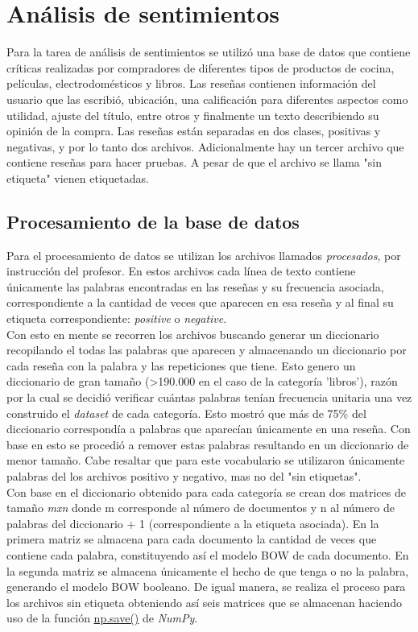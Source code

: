 \section{Análisis de sentimientos}
Para la tarea de análisis de sentimientos se utilizó una base de datos que contiene críticas realizadas por compradores de diferentes tipos de productos de cocina, películas, electrodomésticos y libros. Las reseñas contienen información del usuario que las escribió, ubicación, una calificación para diferentes aspectos como utilidad, ajuste del título, entre otros y finalmente un texto describiendo su opinión de la compra. Las reseñas están separadas en dos clases, positivas y negativas, y por lo tanto dos archivos. Adicionalmente hay un tercer archivo que contiene reseñas para hacer pruebas. A pesar de que el archivo se llama "sin etiqueta" vienen etiquetadas.

\subsection{Procesamiento de la base de datos}

Para el procesamiento de datos se utilizan los archivos llamados \textit{procesados}, por instrucción del profesor. En estos archivos cada línea de texto contiene únicamente las palabras encontradas en las reseñas y su frecuencia asociada, correspondiente a la cantidad de veces que aparecen en esa reseña y al final su etiqueta correspondiente: \textit{positive} o \textit{negative}.\\

Con esto en mente se recorren los archivos buscando generar un diccionario recopilando el todas las palabras que aparecen y almacenando un diccionario por cada reseña con la palabra y las repeticiones que tiene. Esto genero un diccionario de gran tamaño (>190.000 en el caso de la categoría 'libros'), razón por la cual se decidió verificar cuántas palabras tenían frecuencia unitaria una vez construido el \textit{dataset} de cada categoría. Esto mostró que más de 75\% del diccionario correspondía a palabras que aparecían únicamente en una reseña. Con base en esto se procedió a remover estas palabras resultando en un diccionario de menor tamaño. Cabe resaltar que para este vocabulario se utilizaron únicamente palabras del los archivos positivo y negativo, mas no del "sin etiquetas".\\

Con base en el diccionario obtenido para cada categoría se crean dos matrices de tamaño \textit{mxn} donde m corresponde al número de documentos y n al número de palabras del diccionario + 1 (correspondiente a la etiqueta asociada). En la primera matriz se almacena para cada documento la cantidad de veces que contiene cada palabra, constituyendo así el modelo BOW de cada documento. En la segunda matriz se almacena únicamente el hecho de que tenga o no la palabra, generando el modelo BOW booleano. De igual manera, se realiza el proceso para los archivos sin etiqueta obteniendo así seis matrices que se almacenan haciendo uso de la función \url{np.save()} de \textit{NumPy}.\\

